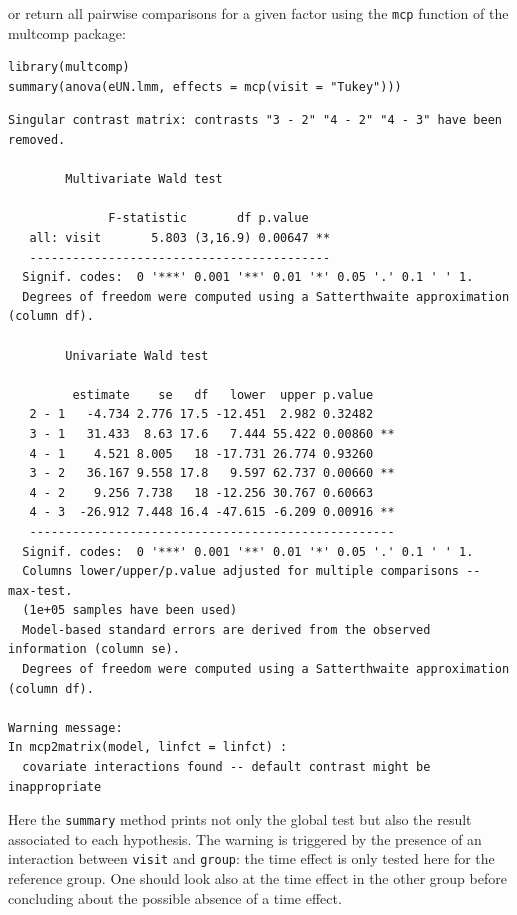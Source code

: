 \documentclass[12pt]{article}
\begin{document}
\clearpage

or return all pairwise comparisons for a given factor using the \texttt{mcp}
function of the multcomp package:
\lstset{language=r,label= ,caption= ,captionpos=b,numbers=none}
\begin{lstlisting}
library(multcomp)
summary(anova(eUN.lmm, effects = mcp(visit = "Tukey")))
\end{lstlisting}

\begin{verbatim}
Singular contrast matrix: contrasts "3 - 2" "4 - 2" "4 - 3" have been removed. 

		Multivariate Wald test 

              F-statistic       df p.value   
   all: visit       5.803 (3,16.9) 0.00647 **
   ------------------------------------------ 
  Signif. codes:  0 '***' 0.001 '**' 0.01 '*' 0.05 '.' 0.1 ' ' 1.
  Degrees of freedom were computed using a Satterthwaite approximation (column df). 

		Univariate Wald test 

         estimate    se   df   lower  upper p.value   
   2 - 1   -4.734 2.776 17.5 -12.451  2.982 0.32482   
   3 - 1   31.433  8.63 17.6   7.444 55.422 0.00860 **
   4 - 1    4.521 8.005   18 -17.731 26.774 0.93260   
   3 - 2   36.167 9.558 17.8   9.597 62.737 0.00660 **
   4 - 2    9.256 7.738   18 -12.256 30.767 0.60663   
   4 - 3  -26.912 7.448 16.4 -47.615 -6.209 0.00916 **
   --------------------------------------------------- 
  Signif. codes:  0 '***' 0.001 '**' 0.01 '*' 0.05 '.' 0.1 ' ' 1.
  Columns lower/upper/p.value adjusted for multiple comparisons -- max-test.
  (1e+05 samples have been used)
  Model-based standard errors are derived from the observed information (column se). 
  Degrees of freedom were computed using a Satterthwaite approximation (column df). 

Warning message:
In mcp2matrix(model, linfct = linfct) :
  covariate interactions found -- default contrast might be inappropriate
\end{verbatim}

Here the \texttt{summary} method prints not only the global test but also the
result associated to each hypothesis. The warning is triggered by the
presence of an interaction between \texttt{visit} and \texttt{group}: the time
effect is only tested here for the reference group. One should look
also at the time effect in the other group before concluding about the
possible absence of a time effect.

\bigskip
\end{document}
